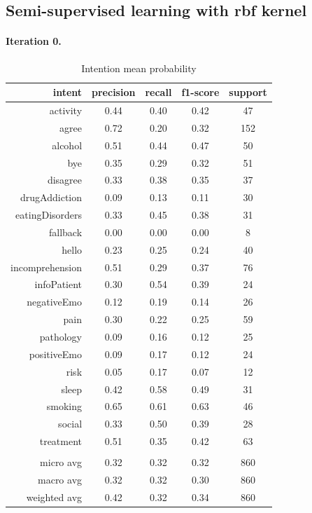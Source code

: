 \documentclass[11pt]{article}
\begin{document}
{\subsection{Semi-supervised learning with rbf kernel}


\paragraph{Iteration 0.}
\begin{table}[htb]
\begin{center}
\begin{tabular}{ |r|c|c|c|c| }
\hline
intent &precision & recall & f1-score & support\\ \hline 
activity & 0.44 & 0.40 & 0.42 &  47\\ \hline 
agree & 0.72 & 0.20 & 0.32 & 152\\ \hline 
alcohol & 0.51 & 0.44 & 0.47 &  50\\ \hline 
bye & 0.35 & 0.29 & 0.32 &  51\\ \hline 
disagree & 0.33 & 0.38 & 0.35 &  37\\ \hline 
drugAddiction & 0.09 & 0.13 & 0.11 &  30\\ \hline 
eatingDisorders & 0.33 & 0.45 & 0.38 &  31\\ \hline 
fallback & 0.00 & 0.00 & 0.00 &   8\\ \hline 
hello & 0.23 & 0.25 & 0.24 &  40\\ \hline 
incomprehension & 0.51 & 0.29 & 0.37 &  76\\ \hline 
infoPatient & 0.30 & 0.54 & 0.39 &  24\\ \hline 
negativeEmo & 0.12 & 0.19 & 0.14 &  26\\ \hline 
pain & 0.30 & 0.22 & 0.25 &  59\\ \hline 
pathology & 0.09 & 0.16 & 0.12 &  25\\ \hline 
positiveEmo & 0.09 & 0.17 & 0.12 &  24\\ \hline 
risk & 0.05 & 0.17 & 0.07 &  12\\ \hline 
sleep & 0.42 & 0.58 & 0.49 &  31\\ \hline 
smoking & 0.65 & 0.61 & 0.63 &  46\\ \hline 
social & 0.33 & 0.50 & 0.39 &  28\\ \hline 
treatment & 0.51 & 0.35 & 0.42 &  63\\ \hline 
\\ \hline 
micro avg & 0.32 & 0.32 & 0.32 & 860\\ \hline 
macro avg & 0.32 & 0.32 & 0.30 & 860\\ \hline 
weighted avg & 0.42 & 0.32 & 0.34 & 860\\ \hline 
\end{tabular}
\caption{Intention mean probability}
\end{center}
\end{table}
\FloatBarrier


}
\end{document}
